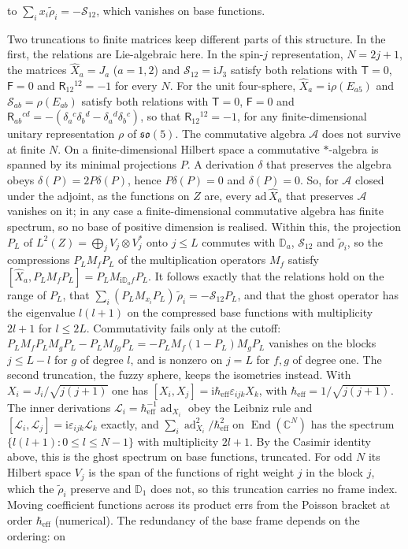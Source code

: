 to \(\sum_ix_i\tilde\rho_i=-\mathcal S_{12}\), which vanishes on base functions.

Two truncations to finite matrices keep different parts of this structure. In the first, the relations are Lie-algebraic here. In the spin-\(j\) representation, \(N=2j+1\), the matrices \(\hat X_a=J_a\) (\(a=1,2\)) and \(\mathcal S_{12}=\mathrm iJ_3\) satisfy both relations with \(\mathsf T=0\), \(\mathsf F=0\) and \(\mathsf R_{12}{}^{12}=-1\) for every \(N\). For the unit four-sphere, \(\hat X_a=\mathrm i\rho(E_{a5})\) and \(\mathcal S_{ab}=\rho(E_{ab})\) satisfy both relations with \(\mathsf T=0\), \(\mathsf F=0\) and \(\mathsf R_{ab}{}^{cd}=-(\delta_a{}^c\delta_b{}^d-\delta_a{}^d\delta_b{}^c)\), so that \(\mathsf R_{12}{}^{12}=-1\), for any finite-dimensional unitary representation \(\rho\) of \(\mathfrak{so}(5)\). The commutative algebra \(\mathcal A\) does not survive at finite \(N\). On a finite-dimensional Hilbert space a commutative \(*\)-algebra is spanned by its minimal projections \(P\). A derivation \(\delta\) that preserves the algebra obeys \(\delta(P)=2P\delta(P)\), hence \(P\delta(P)=0\) and \(\delta(P)=0\). So, for \(\mathcal A\) closed under the adjoint, as the functions on \(Z\) are, every \(\mathrm{ad}\,\hat X_a\) that preserves \(\mathcal A\) vanishes on it; in any case a finite-dimensional commutative algebra has finite spectrum, so no base of positive dimension is realised. Within this, the projection \(P_L\) of \(L^2(Z)=\bigoplus_jV_j\otimes V_j^*\) onto \(j\le L\) commutes with \(\mathbb D_a\), \(\mathcal S_{12}\) and \(\tilde\rho_i\), so the compressions \(P_LM_fP_L\) of the multiplication operators \(M_f\) satisfy \([\hat X_a,P_LM_fP_L]=P_LM_{\mathrm i\mathbb D_af}P_L\). It follows exactly that the relations hold on the range of \(P_L\), that \(\sum_i(P_LM_{x_i}P_L)\,\tilde\rho_i=-\mathcal S_{12}P_L\), and that the ghost operator has the eigenvalue \(l(l+1)\) on the compressed base functions with multiplicity \(2l+1\) for \(l\le2L\). Commutativity fails only at the cutoff: \(P_LM_fP_LM_gP_L-P_LM_{fg}P_L=-P_LM_f(1-P_L)M_gP_L\) vanishes on the blocks \(j\le L-l\) for \(g\) of degree \(l\), and is nonzero on \(j=L\) for \(f,g\) of degree one. The second truncation, the fuzzy sphere, keeps the isometries instead. With \(X_i=J_i/\sqrt{j(j+1)}\) one has \([X_i,X_j]=\mathrm i\hbar_{\mathrm{eff}}\varepsilon_{ijk}X_k\), with \(\hbar_{\mathrm{eff}}=1/\sqrt{j(j+1)}\). The inner derivations \(\mathcal L_i=\hbar_{\mathrm{eff}}^{-1}\operatorname{ad}_{X_i}\) obey the Leibniz rule and \([\mathcal L_i,\mathcal L_j]=\mathrm i\varepsilon_{ijk}\mathcal L_k\) exactly, and \(\sum_i\operatorname{ad}_{X_i}^2/\hbar_{\mathrm{eff}}^2\) on \(\operatorname{End}(\mathbb C^N)\) has the spectrum \(\{l(l+1):0\le l\le N-1\}\) with multiplicity \(2l+1\). By the Casimir identity above, this is the ghost spectrum on base functions, truncated. For odd \(N\) its Hilbert space \(V_j\) is the span of the functions of right weight \(j\) in the block \(j\), which the \(\tilde\rho_i\) preserve and \(\mathbb D_1\) does not, so this truncation carries no frame index. Moving coefficient functions across its product errs from the Poisson bracket at order \(\hbar_{\mathrm{eff}}\) (numerical). The redundancy of the base frame depends on the ordering: on 